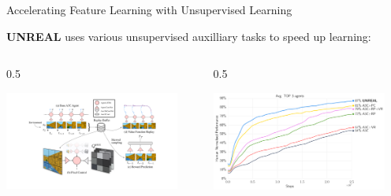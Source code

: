 \documentclass[9pt]{beamer}
\newcommand{\twocolumns}[4]{
\begin{columns}
\begin{column}{#1\textwidth}
    #3
\end{column}
\begin{column}{#2\textwidth}
	#4
\end{column}
\end{columns}
}
\begin{document}
\begin{frame}{Accelerating Feature Learning with Unsupervised Learning}

\textbf{UNREAL} uses various unsupervised auxilliary tasks to speed up learning:

\twocolumns{0.5}{0.5}{
\begin{center}
\includegraphics[width=0.9\textwidth]{p2-unreal2}
\end{center}
}{
\begin{center}
\includegraphics[width=0.9\textwidth]{p2-unreal-labyrinth}
\end{center}
}
\vspace{1em}



%

\end{frame}
\end{document}
